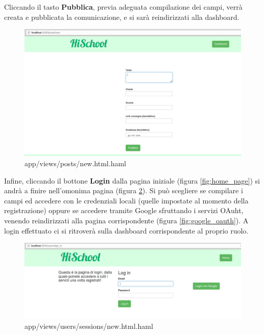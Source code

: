 \documentclass[Lau, binding=0.6cm, oneside]{sapthesis}
\begin{document}
Cliccando il tasto \textbf{Pubblica}, previa adeguata compilazione dei campi, verrà creata e pubblicata la comunicazione, e si sarà reindirizzati alla dashboard.\\

\begin{figure}[H]
	\centering
	\includegraphics[width=1\linewidth]{images/new_post} 
	\caption{app/views/posts/new.html.haml}
	\label{fig:nuovo_post}
\end{figure}

Infine, cliccando il bottone \textbf{Login} dalla pagina iniziale (figura \ref{fig:home_page}) si andrà a finire nell'omonima pagina (figura \ref{fig:login}). Si può scegliere se compilare i campi ed accedere con le credenziali locali (quelle impostate al momento della registrazione) oppure se accedere tramite Google sfruttando i servizi OAuht, venendo reindirizzati alla pagina corrispondente (figura \ref{fig:google_oauth}). 
A login effettuato ci si ritroverà sulla dashboard corrispondente al proprio ruolo.

\begin{figure}[H]
	\centering
	\includegraphics[width=1\linewidth]{images/login} 
	\caption{app/views/users/sessions/new.html.haml}
	\label{fig:login}
\end{figure}
\end{document}
